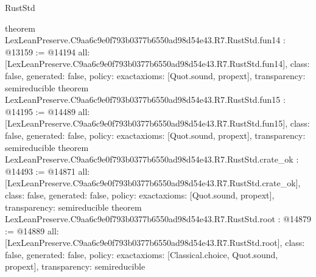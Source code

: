 \begin{lexlean}{RustStd}
\begin{coremodule}
{}
theorem LexLeanPreserve.C9aa6c9e0f793b0377b6550ad98d54e43.R7.RustStd.fun14 : @13159 := @14194 {
  all: [LexLeanPreserve.C9aa6c9e0f793b0377b6550ad98d54e43.R7.RustStd.fun14],
  class: false,
  generated: false,
  policy: exact{axioms: [Quot.sound, propext]},
  transparency: semireducible
}
theorem LexLeanPreserve.C9aa6c9e0f793b0377b6550ad98d54e43.R7.RustStd.fun15 : @14195 := @14489 {
  all: [LexLeanPreserve.C9aa6c9e0f793b0377b6550ad98d54e43.R7.RustStd.fun15],
  class: false,
  generated: false,
  policy: exact{axioms: [Quot.sound, propext]},
  transparency: semireducible
}
theorem LexLeanPreserve.C9aa6c9e0f793b0377b6550ad98d54e43.R7.RustStd.crate_ok : @14493 := @14871 {
  all: [LexLeanPreserve.C9aa6c9e0f793b0377b6550ad98d54e43.R7.RustStd.crate_ok],
  class: false,
  generated: false,
  policy: exact{axioms: [Quot.sound, propext]},
  transparency: semireducible
}
theorem LexLeanPreserve.C9aa6c9e0f793b0377b6550ad98d54e43.R7.RustStd.root : @14879 := @14889 {
  all: [LexLeanPreserve.C9aa6c9e0f793b0377b6550ad98d54e43.R7.RustStd.root],
  class: false,
  generated: false,
  policy: exact{axioms: [Classical.choice, Quot.sound, propext]},
  transparency: semireducible
}


\end{coremodule}
\end{lexlean}
